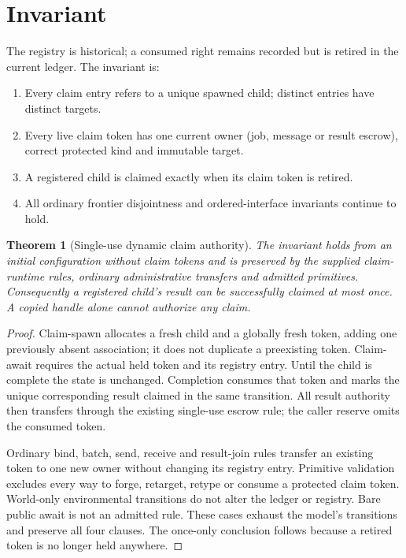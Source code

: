 \documentclass[11pt]{article}
\newtheorem{theorem}{Theorem}
\begin{document}
\section{Invariant}
The registry is historical; a consumed right remains recorded but is retired in the current ledger. The invariant is:
\begin{enumerate}
\item Every claim entry refers to a unique spawned child; distinct entries have distinct targets.
\item Every live claim token has one current owner (job, message or result escrow), correct protected kind and immutable target.
\item A registered child is claimed exactly when its claim token is retired.
\item All ordinary frontier disjointness and ordered-interface invariants continue to hold.
\end{enumerate}
\begin{theorem}[Single-use dynamic claim authority]
The invariant holds from an initial configuration without claim tokens and is preserved by the supplied claim-runtime rules, ordinary administrative transfers and admitted primitives. Consequently a registered child's result can be successfully claimed at most once. A copied handle alone cannot authorize any claim.
\end{theorem}
\begin{proof}
Claim-spawn allocates a fresh child and a globally fresh token, adding one previously absent association; it does not duplicate a preexisting token. Claim-await requires the actual held token and its registry entry. Until the child is complete the state is unchanged. Completion consumes that token and marks the unique corresponding result claimed in the same transition. All result authority then transfers through the existing single-use escrow rule; the caller reserve omits the consumed token.

Ordinary bind, batch, send, receive and result-join rules transfer an existing token to one new owner without changing its registry entry. Primitive validation excludes every way to forge, retarget, retype or consume a protected claim token. World-only environmental transitions do not alter the ledger or registry. Bare public await is not an admitted rule. These cases exhaust the model's transitions and preserve all four clauses. The once-only conclusion follows because a retired token is no longer held anywhere.
\end{proof}
\end{document}
